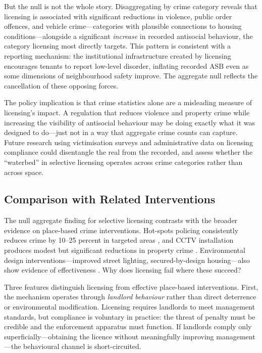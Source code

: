 \documentclass[12pt]{article}
\begin{document}
But the null is not the whole story. Disaggregating by crime category reveals that licensing is associated with significant reductions in violence, public order offences, and vehicle crime---categories with plausible connections to housing conditions---alongside a significant \emph{increase} in recorded antisocial behaviour, the category licensing most directly targets. This pattern is consistent with a reporting mechanism: the institutional infrastructure created by licensing encourages tenants to report low-level disorder, inflating recorded ASB even as some dimensions of neighbourhood safety improve. The aggregate null reflects the cancellation of these opposing forces.

The policy implication is that crime statistics alone are a misleading measure of licensing's impact. A regulation that reduces violence and property crime while increasing the visibility of antisocial behaviour may be doing exactly what it was designed to do---just not in a way that aggregate crime counts can capture. Future research using victimisation surveys and administrative data on licensing compliance could disentangle the real from the recorded, and assess whether the ``waterbed'' in selective licensing operates across crime categories rather than across space.

\subsection{Comparison with Related Interventions}

The null aggregate finding for selective licensing contrasts with the broader evidence on place-based crime interventions. Hot-spots policing consistently reduces crime by 10--25 percent in targeted areas \citep{braga2014}, and CCTV installation produces modest but significant reductions in property crime \citep{welsh2009}. Environmental design interventions---improved street lighting, secured-by-design housing---also show evidence of effectiveness \citep{farrington2007}. Why does licensing fail where these succeed?

Three features distinguish licensing from effective place-based interventions. First, the mechanism operates through \emph{landlord behaviour} rather than direct deterrence or environmental modification. Licensing requires landlords to meet management standards, but compliance is voluntary in practice: the threat of penalty must be credible and the enforcement apparatus must function. If landlords comply only superficially---obtaining the licence without meaningfully improving management---the behavioural channel is short-circuited.
\end{document}
